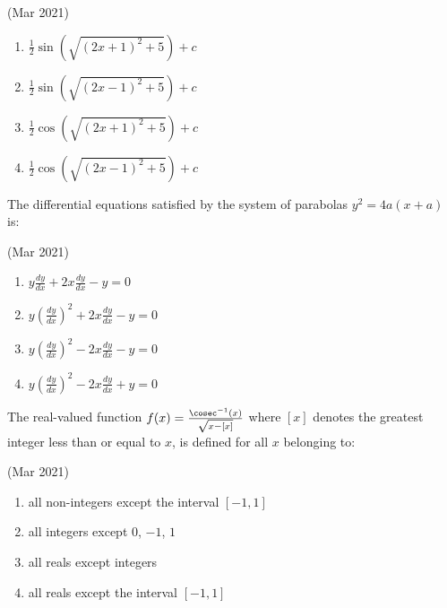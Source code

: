 	\hfill{(Mar 2021)}
	\begin{multicols}{2}
               \begin{enumerate}
    \item $ \frac{1}{2} \sin\left(\sqrt{(2x + 1)^2 + 5}\right) + c $
    \item $ \frac{1}{2} \sin\left(\sqrt{(2x - 1)^2 + 5}\right) + c $
    \item $ \frac{1}{2} \cos\left(\sqrt{(2x + 1)^2 + 5}\right) + c $
    \item $ \frac{1}{2} \cos\left(\sqrt{(2x - 1)^2 + 5}\right) + c $
               \end{enumerate}
	\end{multicols}
       \item
	       The differential equations satisfied by the system of parabolas $ y^2 = 4a(x + a)$ is:

	       	\hfill{(Mar 2021)}
		\begin{multicols}{2}
	       \begin{enumerate}
    \item $ y \frac{dy}{dx} + 2x \frac{dy}{dx} - y = 0 $
    \item $ y \left(\frac{dy}{dx}\right)^2 + 2x \frac{dy}{dx} - y = 0 $
    \item $ y \left(\frac{dy}{dx}\right)^2 - 2x \frac{dy}{dx} - y = 0 $
    \item $ y \left(\frac{dy}{dx}\right)^2 - 2x \frac{dy}{dx} + y = 0 $
               \end{enumerate}
		\end{multicols}
       \item
	       The real-valued function $ f(x) = \frac{\cosec^{-1}(x)}{\sqrt{x - [x]}}$ where $[x]$ denotes the greatest integer less than or equal to $x$, is defined for all $x$ belonging to:

	       	\hfill{(Mar 2021)}
		\begin{multicols}{1}
	       \begin{enumerate}
    \item all non-integers except the interval $[-1, 1]$
    \item all integers except $0$, $-1$, $1$
    \item all reals except integers
    \item all reals except the interval $[-1, 1]$
               \end{enumerate}
		\end{multicols}
